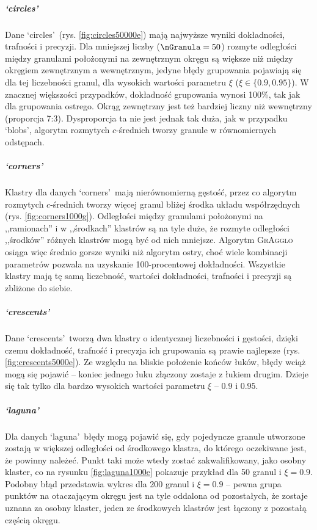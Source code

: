 \documentclass[a4paper,twoside,12pt]{book}
\newcommand{\dataset}[1]{`#1'}
\newcommand{\blobs}{\dataset{blobs}}
\newcommand{\circles}{\dataset{circles}}
\newcommand{\corners}{\dataset{corners}}
\newcommand{\crescents}{\dataset{crescents}}
\newcommand{\laguna}{\dataset{laguna}}
\newcommand{\procedura}[1]{\textsc{#1}}
\newcommand{\MojAlg}{\procedura{GrAgglo}}
\begin{document}
\subparagraph{\circles{}}
Dane \circles\ (rys. \ref{fig:circles50000e}) mają najwyższe wyniki dokładności, trafności i precyzji. Dla mniejszej liczby ($\nGranula = 50$) rozmyte odległości między granulami położonymi na zewnętrznym okręgu są większe niż między okręgiem zewnętrznym a wewnętrznym, jedyne błędy grupowania pojawiają się dla tej liczebności granul, dla wysokich wartości parametru $\xi$ ($\xi \in \{\num{0.9}, \num{0.95}\}$). W znacznej większości przypadków, dokładność grupowania wynosi 100\%, tak jak dla grupowania ostrego. Okrąg zewnętrzny jest też bardziej liczny niż wewnętrzny (proporcja 7:3). Dysproporcja ta nie jest jednak tak duża, jak w przypadku \blobs{}, algorytm rozmytych $c$-średnich tworzy granule w równomiernych odstępach.

\subparagraph{\corners{}}
Klastry dla danych \corners\  mają nierównomierną gęstość, przez co algorytm rozmytych $c$-średnich tworzy więcej granul bliżej środka układu współrzędnych (rys. \ref{fig:corners1000g}).
Odległości między granulami położonymi na ,,ramionach'' i w ,,środkach'' klastrów są na tyle duże, że rozmyte odległości ,,środków'' różnych klastrów mogą być od nich mniejsze. Algorytm \MojAlg{} osiąga więc średnio gorsze wyniki niż algorytm ostry, choć wiele kombinacji parametrów pozwala na uzyskanie 100-procentowej dokładności.
Wszystkie klastry mają tę samą liczebność, wartości dokładności, trafności i precyzji są zbliżone do siebie.

\subparagraph{\crescents{}}
Dane \crescents\  tworzą dwa klastry o identycznej liczebności i gęstości, dzięki czemu dokładność, trafność i precyzja ich grupowania są prawie najlepsze (rys. \ref{fig:crescents5000e}). Ze względu na bliskie położenie końców łuków, błędy wciąż mogą się pojawić -- koniec jednego łuku złączony zostaje z łukiem drugim. Dzieje się tak tylko dla bardzo wysokich wartości parametru $\xi$ -- $\num{0.9}$ i $\num{0.95}$.

\subparagraph{\laguna{}}
Dla danych \laguna\, błędy mogą pojawić się, gdy pojedyncze granule utworzone zostają w większej odległości od środkowego klastra, do którego oczekiwane jest, że powinny należeć. Punkt taki może wtedy zostać zakwalifikowany, jako osobny klaster, co na rysunku \ref{fig:laguna1000e} pokazuje przykład dla 50 granul i $\xi=\num{0.9}$. Podobny błąd przedstawia wykres dla 200 granul i $\xi=\num{0.9}$ -- pewna grupa punktów na otaczającym okręgu jest na tyle oddalona od pozostałych, że zostaje uznana za osobny klaster, jeden ze środkowych klastrów jest łączony z pozostałą częścią okręgu. 
\end{document}
